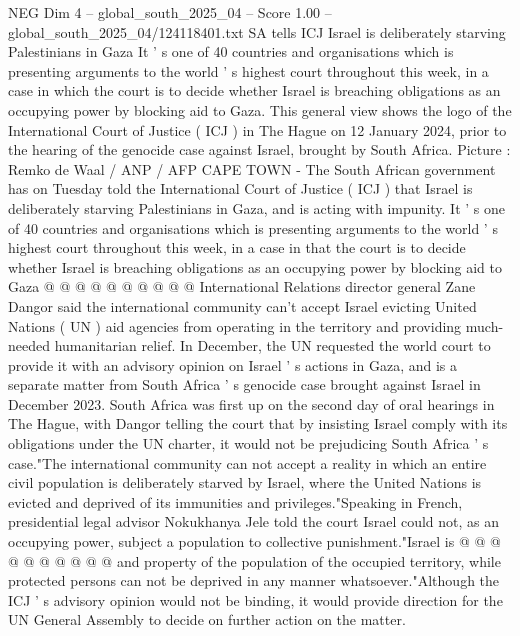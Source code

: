 \begin{textsample}{NEG Dim 4 – global\_south\_2025\_04 – Score 1.00 – global\_south\_2025\_04/124118401.txt}  \label{ex:f4_neg_234}
SA tells ICJ Israel is deliberately starving Palestinians in Gaza It ' s one of 40 countries and organisations which is presenting arguments to the world ' s highest court throughout this week, in a case in which the court is to decide whether Israel is breaching obligations as an occupying power by blocking aid to Gaza.
This general view shows the logo of the International Court of Justice ( ICJ ) in The Hague on 12 January 2024, prior to the hearing of the genocide case against Israel, brought by South Africa.
Picture : Remko de Waal / ANP / AFP CAPE TOWN - The South African government has on Tuesday told the International Court of Justice ( ICJ ) that Israel is deliberately starving Palestinians in Gaza, and is acting with impunity.
It ' s one of 40 countries and organisations which is presenting arguments to the world ' s highest court throughout this week, in a case in that the court is to decide whether Israel is breaching obligations as an occupying power by blocking aid to Gaza @ @ @ @ @ @ @ @ @ @ International Relations director general Zane Dangor said the international community can't accept Israel evicting United Nations ( UN ) aid agencies from operating in the territory and providing much-needed humanitarian relief.
In December, the UN requested the world court to provide it with an advisory opinion on Israel ' s actions in Gaza, and is a separate matter from South Africa ' s genocide case brought against Israel in December 2023.
South Africa was first up on the second day of oral hearings in The Hague, with Dangor telling the court that by insisting Israel comply with its obligations under the UN charter, it would not be prejudicing South Africa ' s case."The international community can not accept a reality in which an entire civil population is deliberately starved by Israel, where the United Nations is evicted and deprived of its immunities and privileges."Speaking in French, presidential legal advisor Nokukhanya Jele told the court Israel could not, as an occupying power, subject a population to collective punishment."Israel is @ @ @ @ @ @ @ @ @ @ and property of the population of the occupied territory, while protected persons can not be deprived in any manner whatsoever."Although the ICJ ' s advisory opinion would not be binding, it would provide direction for the UN General Assembly to decide on further action on the matter.

\end{textsample}
